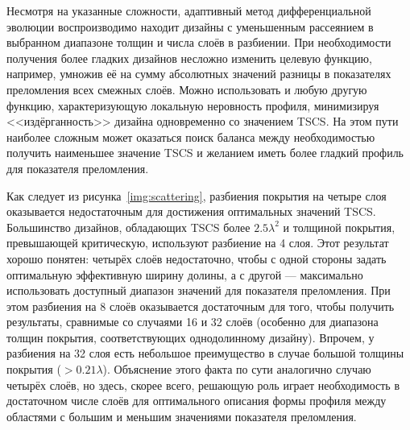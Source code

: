 Несмотря на указанные сложности, адаптивный метод дифференциальной
эволюции воспроизводимо находит дизайны с уменьшенным рассеянием в
выбранном диапазоне толщин и числа слоёв в разбиении.  При
необходимости получения более гладких дизайнов несложно изменить
целевую функцию, например, умножив её на сумму абсолютных значений
разницы в показателях преломления всех смежных слоёв.  Можно
использовать и любую другую функцию, характеризующую локальную
неровность профиля, минимизируя <<издёрганность>> дизайна одновременно
со значением TSCS.  На этом пути наиболее сложным может оказаться
поиск баланса между необходимостью получить наименьшее значение TSCS и
желанием иметь более гладкий профиль для показателя преломления.

Как следует из рисунка~\ref{img:scattering}, разбиения покрытия на
четыре слоя оказывается недостаточным для достижения оптимальных
значений TSCS.  Большинство дизайнов, обладающих TSCS более
$2.5\lambda^2$ и толщиной покрытия, превышающей критическую,
используют разбиение на 4 слоя.  Этот результат хорошо понятен:
четырёх слоёв недостаточно, чтобы с одной стороны задать оптимальную
эффективную ширину долины, а с другой --- максимально использовать
доступный диапазон значений для показателя преломления.  При этом
разбиения на 8 слоёв оказывается достаточным для того, чтобы получить
результаты, сравнимые со случаями 16 и 32 слоёв (особенно для
диапазона толщин покрытия, соответствующих однодолинному дизайну).
Впрочем, у разбиения на 32 слоя есть небольшое преимущество в
случае большой толщины покрытия (${> 0.21\lambda}$). Объяснение этого
факта по сути аналогично случаю четырёх слоёв, но здесь, скорее
всего, решающую роль играет необходимость в достаточном числе слоёв
для оптимального описания формы профиля между областями с большим и
меньшим значениями показателя преломления.
\begin{figure}
\end{figure}

